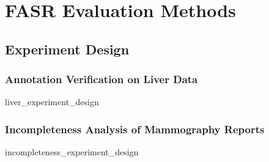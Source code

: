 \chapter{FASR Evaluation Methods}

\section{Experiment Design}

\subsection{Annotation Verification on Liver Data}
{liver_experiment_design}

\subsection{Incompleteness Analysis of Mammography Reports}
{incompleteness_experiment_design}
